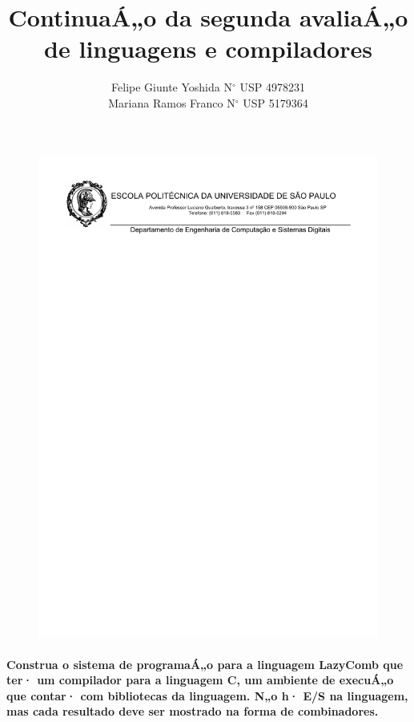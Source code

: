 \documentclass[12pt,a4paper]{article}
\title{ContinuaÁ„o da segunda avaliaÁ„o de linguagens e compiladores}
\author{Felipe Giunte Yoshida N$^{\circ}$ USP 4978231\\Mariana Ramos Franco N$^{\circ}$ USP 5179364}
\begin{document}
 

\begin{figure}[!t]
\centering 
\includegraphics[width=15.5cm]{logo.pdf}
\end{figure}

\maketitle 

\paragraph{Construa o sistema de programaÁ„o para a linguagem LazyComb que ter· um compilador para a linguagem C, um ambiente de execuÁ„o que contar· com bibliotecas da linguagem. N„o h· E/S na linguagem, mas cada resultado deve ser mostrado na forma de combinadores.}
\end{document}
